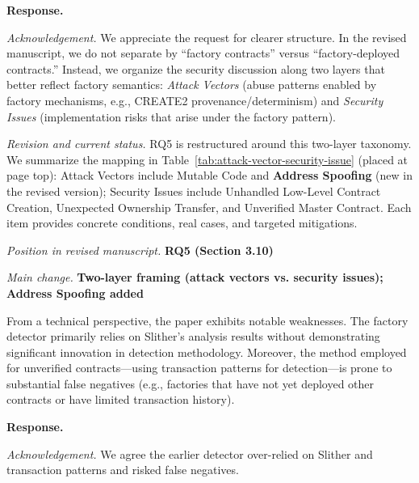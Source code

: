 \documentclass[acmsmall]{acmart}
\begin{document}
	\noindent
	\textbf{Response.}

	\textit{Acknowledgement.} We appreciate the request for clearer structure. In the revised manuscript,
	we do not separate by “factory contracts” versus “factory-deployed contracts.” Instead, we organize
	the security discussion along two layers that better reflect factory semantics: \textit{Attack
	Vectors} (abuse patterns enabled by factory mechanisms, e.g., CREATE2 provenance/determinism)
	and \textit{Security Issues} (implementation risks that arise under the factory pattern).

	\textit{Revision and current status.} RQ5 is restructured around this two-layer taxonomy. We summarize
	the mapping in Table~\ref{tab:attack-vector-security-issue} (placed at page top): Attack Vectors
	include Mutable Code and \textbf{Address Spoofing} (new in the revised version); Security Issues
	include Unhandled Low-Level Contract Creation, Unexpected Ownership Transfer, and Unverified
	Master Contract. Each item provides concrete conditions, real cases, and targeted mitigations.

	

	\textit{Position in revised manuscript.} {\color{red}\textbf{RQ5 (Section 3.10)}}

	\textit{Main change.} {\color{blue}\textbf{Two-layer framing (attack vectors vs. security issues); Address Spoofing added}}

	\begin{tcolorbox}
		[commentbox,title=Reviewer \#3 -- Comment 4] From a technical perspective, the paper
		exhibits notable weaknesses. The factory detector primarily relies on Slither's analysis results
		without demonstrating significant innovation in detection methodology. Moreover, the method employed
		for unverified contracts—using transaction patterns for detection—is prone to substantial false
		negatives (e.g., factories that have not yet deployed other contracts or have limited
		transaction history).
	\end{tcolorbox}

	\noindent
	\textbf{Response.}

	\textit{Acknowledgement.} We agree the earlier detector over-relied on Slither and transaction
	patterns and risked false negatives.
\end{document}
